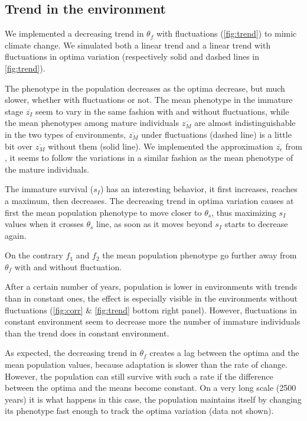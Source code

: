 \subsection*{Trend in the environment}

We implemented a decreasing trend in $\theta_f$ with fluctuations (\autoref{fig:trend}) to mimic climate change. We simulated both a linear trend and a linear trend with fluctuations in optima variation (respectively solid and dashed lines in \autoref{fig:trend}).

The phenotype in the population decreases as the optima decrease, but much slower, whether with fluctuations or not. The mean phenotype in the immature stage $\overline{z_I}$ seem to vary in the same fashion with and without fluctuations, while the mean phenotypes among mature individuals $\overline{z_M}$ are almost indistinguishable in the two types of environments, $\overline{z_M}$ under fluctuations (dashed line) is a little bit over $\overline{z_M}$ without them (solid line). We implemented the approximation $\overline{z_\epsilon}$ from \citep{engen_evolution_2011}, it seems to follow the variations in a similar fashion as the mean phenotype of the mature individuals.

The immature survival ($s_I$) has an interesting behavior, it first increases, reaches a maximum, then decreases. The decreasing trend in optima variation causes at first the mean population phenotype to move closer to $\theta_s$, thus maximizing $s_I$ values when it crosses $\theta_s$ line, as soon as it moves beyond $s_I$ starts to decrease again.

On the contrary $f_1$ and $f_2$ the mean population phenotype go further away from $\theta_f$ with and without fluctuation.

After a certain number of years, population is lower in environments with trends than in constant ones, the effect is especially visible in the environments without fluctuations (\autoref{fig:corr} \& \autoref{fig:trend} bottom right panel). However, fluctuations in constant environment seem to decrease more the number of immature individuals than the trend does in constant environment. 

As expected, the decreasing trend in $\theta_f$ creates a lag between the optima and the mean population values, because adaptation is slower than the rate of change. However, the population can still survive with such a rate if the difference between the optima and the means become constant. On a very long scale (2500 years) it is what happens in this case, the population maintains itself by changing its phenotype fast enough to track the optima variation (data not shown).

